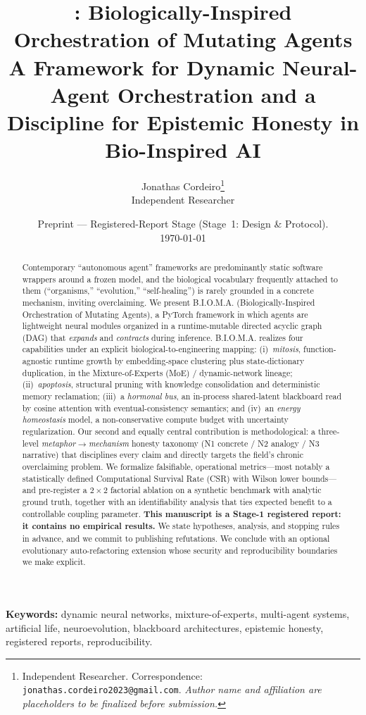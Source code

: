 \documentclass[11pt]{article}
\title{\bioma{}: Biologically-Inspired Orchestration of Mutating Agents\\[2pt]
\large A Framework for Dynamic Neural-Agent Orchestration and a Discipline for
Epistemic Honesty in Bio-Inspired AI}
\author{%
Jonathas Cordeiro\thanks{Independent Researcher. Correspondence:
\texttt{jonathas.cordeiro2023@gmail.com}. \emph{Author name and affiliation are
placeholders to be finalized before submission.}}\\
Independent Researcher}
\date{Preprint --- Registered-Report Stage (Stage~1: Design \& Protocol). \\
\today}
\newcommand{\bioma}{\textsc{B.I.O.M.A.}}
\begin{document}
\maketitle

\begin{abstract}
\noindent
Contemporary ``autonomous agent'' frameworks are predominantly static software
wrappers around a frozen model, and the biological vocabulary frequently
attached to them (``organisms,'' ``evolution,'' ``self-healing'') is rarely
grounded in a concrete mechanism, inviting overclaiming. We present \bioma{}
(Biologically-Inspired Orchestration of Mutating Agents), a PyTorch framework in
which agents are lightweight neural modules organized in a runtime-mutable
directed acyclic graph (DAG) that \emph{expands} and \emph{contracts} during
inference. \bioma{} realizes four capabilities under an explicit
biological-to-engineering mapping: (i)~\emph{mitosis}, function-agnostic runtime
growth by embedding-space clustering plus state-dictionary duplication, in the
Mixture-of-Experts (MoE) / dynamic-network lineage; (ii)~\emph{apoptosis},
structural pruning with knowledge consolidation and deterministic memory
reclamation; (iii)~a \emph{hormonal bus}, an in-process shared-latent blackboard
read by cosine attention with eventual-consistency semantics; and (iv)~an
\emph{energy homeostasis} model, a non-conservative compute budget with
uncertainty regularization. Our second and equally central contribution is
methodological: a three-level \emph{metaphor$\rightarrow$mechanism} honesty
taxonomy (N1 concrete / N2 analogy / N3 narrative) that disciplines every claim
and directly targets the field's chronic overclaiming problem. We formalize
falsifiable, operational metrics---most notably a statistically defined
Computational Survival Rate (CSR) with Wilson lower bounds---and pre-register a
$2\times2$ factorial ablation on a synthetic benchmark with analytic ground
truth, together with an identifiability analysis that ties expected benefit to a
controllable coupling parameter. \textbf{This manuscript is a Stage-1
registered report: it contains no empirical results.} We state hypotheses,
analysis, and stopping rules in advance, and we commit to publishing refutations.
We conclude with an optional evolutionary auto-refactoring extension whose
security and reproducibility boundaries we make explicit.
\end{abstract}

\medskip
\noindent\textbf{Keywords:} dynamic neural networks, mixture-of-experts,
multi-agent systems, artificial life, neuroevolution, blackboard architectures,
epistemic honesty, registered reports, reproducibility.
\end{document}
